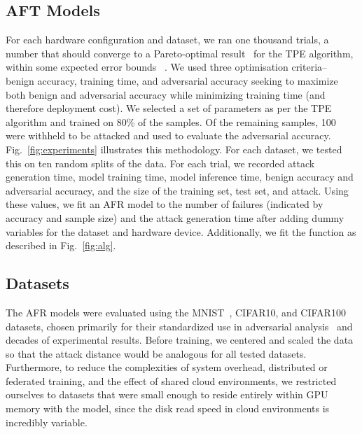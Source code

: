 \documentclass[conference]{IEEEtran}
\begin{document}
\subsection{AFT Models}

For each hardware configuration and dataset, we ran one thousand trials, a number that should converge to a Pareto-optimal result~\cite{ozaki2020multiobjective,zitzler2008quality} for the TPE algorithm, within some expected error bounds ~\cite{legriel2010approximating}. We used three optimisation criteria-- benign accuracy, training time, and adversarial accuracy seeking to maximize both benign and adversarial accuracy while minimizing training time (and therefore deployment cost). We selected a set of parameters as per the TPE algorithm and trained on 80\% of the samples. Of the remaining samples, 100 were withheld to be attacked and used to evaluate the adversarial accuracy. Fig.~\ref{fig:experiments} illustrates this methodology. For each dataset, we tested this on ten random splits of the data. For each trial, we recorded attack generation time, model training time, model inference time, benign accuracy and adversarial accuracy, and the size of the training set, test set, and attack. Using these values, we fit an AFR model to the number of failures (indicated by accuracy and sample size) and the attack generation time after adding dummy variables for the dataset and hardware device. Additionally, we fit the function as described in Fig.~\ref{fig:alg}.

\subsection{Datasets}
The AFR models were evaluated using the MNIST~\cite{mnist}, CIFAR10\cite{cifar}, and CIFAR100\cite{cifar} datasets, chosen primarily for their standardized use in adversarial analysis~\cite{madry2017towards,croce_reliable_2020,carlini_towards_2017,deepfool} and decades of experimental results.
Before training, we centered and scaled the data so that the attack distance would be analogous for all tested datasets. Furthermore, to reduce the complexities of system overhead, distributed or federated training, and the effect of shared cloud environments, we restricted ourselves to datasets that were small enough to reside entirely within GPU memory with the model, since the disk read speed in cloud environments is incredibly variable.
\end{document}
